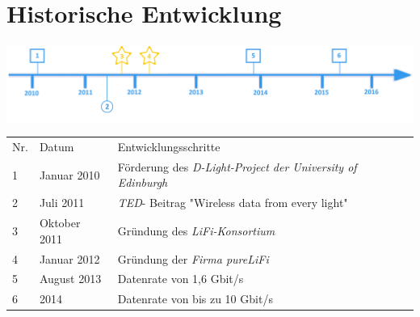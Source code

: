 \section*{Historische Entwicklung}
\includegraphics[width=\textwidth]{Kapitel/lifi/Grafiken/Zeitstrahl}
\par
\noindent
{}
\begin{tabular}{p{0.5 cm}p{1.5 cm}p{15.55 cm}}
	Nr. & Datum & Entwicklungsschritte~\cite{lifi.2}\\
	1 & Januar 2010 & Förderung des \textit{D-Light-Project der University of Edinburgh} \\
	2 & Juli 2011 & \textit{TED}- Beitrag "Wireless data from every light"\\
	3 & Oktober 2011 & Gründung des \textit{LiFi-Konsortium}\\
	4 & Januar 2012  & Gründung der \textit{Firma pureLiFi}\\
	5 & August 2013 & Datenrate von 1,6 Gbit/s\\
	6 & 2014 & Datenrate von bis zu 10 Gbit/s \\
\end{tabular}
\par

